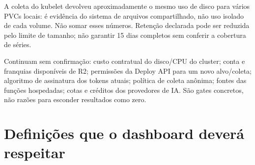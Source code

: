 \documentclass[10pt,a4paper]{article}
\begin{document}
A coleta do kubelet devolveu aproximadamente o mesmo uso de disco para
vários PVCs locais: é evidência do sistema de arquivos compartilhado,
não uso isolado de cada volume. Não somar esses números. Retenção
declarada pode ser reduzida pelo limite de tamanho; não garantir 15 dias
completos sem conferir a cobertura de séries.

Continuam sem confirmação: custo contratual do disco/CPU do cluster;
conta e franquias disponíveis de R2; permissões da Deploy API para um
novo alvo/coleta; algoritmo de assinatura dos tokens atuais; política de
coleta anônima; fontes das funções hospedadas; cotas e créditos dos
provedores de IA. São gates concretos, não razões para esconder
resultados como zero.

\clearpage
\section{Definições que o dashboard deverá
respeitar}\label{definiuxe7uxf5es-que-o-dashboard-deveruxe1-respeitar}
\end{document}
